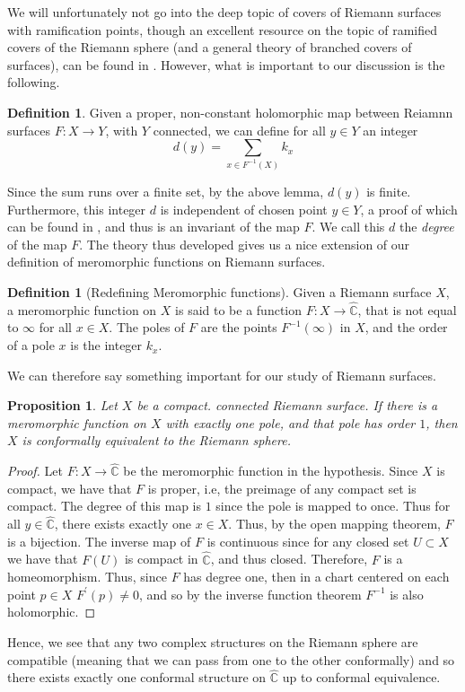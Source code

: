 \documentclass[11pt]{report}
\newtheorem{prop}[thm]{Proposition}
\theoremstyle{definition}
\newtheorem{defn}[thm]{Definition}
\begin{document}
We will unfortunately not go into the deep topic of covers of Riemann surfaces with ramification points, though an excellent resource on the topic of ramified covers of the Riemann sphere (and a general theory of branched covers of surfaces), can be found in \cite{algebra}. However, what is important to our discussion is the following.
\begin{defn}
  Given a proper, non-constant holomorphic map between Reiamnn surfaces $F:X \rightarrow Y$, with $Y$ connected, we can define for all $y\in Y$ an integer \[ d(y) = \sum\limits_{x \in F^{-1}(X)}k_x \]
\end{defn}
Since the sum runs over a finite set, by the above lemma, $d(y)$ is finite. Furthermore, this integer $d$ is independent of chosen point $y \in Y$, a proof of which can be found in \cite[Proposition 7]{donaldson}, and thus is an invariant of the map $F$. We call this $d$ the \emph{degree} of the map $F$. The theory thus developed gives us a nice extension of our definition of meromorphic functions on Riemann surfaces.
\begin{defn}[Redefining Meromorphic functions]
  Given a Riemann surface $X$, a meromorphic function on $X$ is said to be a function $F:X\rightarrow \widehat{\mathbb{C}}$, that is not equal to $\infty$ for all $x \in X$. The poles of $F$ are the points $F^{-1}(\infty)$ in $X$, and the order of a pole $x$ is the integer $k_x$. 
\end{defn}
We can therefore say something important for our study of Riemann surfaces.
\begin{prop}
  Let $X$ be a compact. connected Riemann surface. If there is a meromorphic function on $X$ with exactly one pole, and that pole has order $1$, then $X$ is conformally equivalent to the Riemann sphere.
\end{prop}
\begin{proof}
  Let $F:X \rightarrow \widehat{\mathbb{C}}$ be the meromorphic function in the hypothesis. Since $X$ is compact, we have that $F$ is proper, i.e, the preimage of any compact set is compact. The degree of this map is $1$ since the pole is mapped to once. Thus for all $y \in \widehat{\mathbb{C}}$, there exists exactly one $x \in X$. Thus, by the open mapping theorem, $F$ is a bijection. The inverse map of $F$ is continuous since for any closed set $U \subset X$ we have that $F(U)$ is compact in $\widehat{\mathbb{C}}$, and thus closed. Therefore, $F$ is a homeomorphism. Thus, since $F$ has degree one, then in a chart centered on each point $p \in X$ $F^{\prime}(p)\neq 0$, and so by the inverse function theorem $F^{-1}$ is also holomorphic. 
\end{proof}
Hence, we see that any two complex structures on the Riemann sphere are compatible (meaning that we can pass from one to the other conformally) and so there exists exactly one conformal structure on $\widehat{\mathbb{C}}$ up to conformal equivalence.
\end{document}
